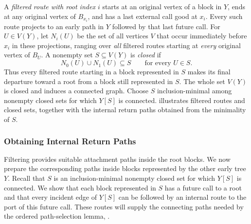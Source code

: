 \documentclass[USenglish, a4paper, thm-restate,numberwithinsect, cleveref]{lipics-v2021}
\begin{document}
A \emph{filtered route with root index $i$} starts at an original vertex of
a block in $Y$, ends at any original vertex of $B_{x_i}$, and has a
last external call good at $x_i$. Every such route projects to an
early path in $Y$ followed by that last future call. For $U\in V(Y)$,
let $N_i(U)$ be the set of all vertices $V$ that occur immediately
before $x_i$ in these projections, ranging over \emph{all} filtered
routes starting at \emph{every} original vertex of $B_U$.
A nonempty set $S\subseteq V(Y)$ is \emph{closed} if
\[
 N_0(U)\cup N_1(U)\subseteq S\qquad\text{for every }U\in S.
\]
Thus every filtered route starting in a block represented in $S$
makes its final departure toward a root from a block still
represented in $S$.
The whole set $V(Y)$ is closed and induces a connected graph. Choose
$S$ inclusion-minimal among nonempty closed sets for which $Y[S]$ is
connected.  illustrates filtered routes and
closed sets, together with the internal return paths obtained from
the minimality of $S$.

\subsubsection{Obtaining Internal Return Paths}

Filtering provides suitable attachment paths inside the root blocks.
We now prepare the corresponding paths inside blocks represented by
the other early tree $Y$. Recall that $S$ is an inclusion-minimal
nonempty closed set for which $Y[S]$ is connected. We show that each
block represented in $S$ has a future call to a root and that every
incident edge of $Y[S]$ can be followed by an internal route to the
port of this future call. These routes will supply the connecting
paths needed by the ordered path-selection lemma,
.
\end{document}
